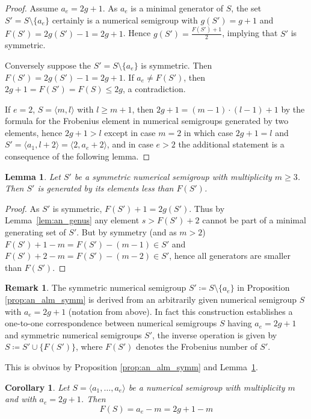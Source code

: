 \documentclass[a4paper,12pt,scrbook]{amsart}
\theoremstyle{plain}%
\newtheorem{lemma}[satz]{Lemma}
\newtheorem{corollary}[satz]{Corollary}
\theoremstyle{definition}
\newtheorem{rem}[satz]{Remark}
\begin{document}
\begin{proof}
Assume $a_e = 2g+1$. 
As $a_e$ is a minimal generator of $S$, the set $S' = S \setminus \{ a_e\}$ certainly 
is a numerical semigroup with $g(S') = g+1$ and $F(S') = 2 g(S')-1 = 2g+1$. Hence 
$g(S') = \frac {F(S')+1}{2}$, implying that $S'$ is symmetric. 

Conversely suppose the $S' =S \setminus\{a_e\}$ is symmetric. Then 
$F(S') = 2g(S')-1 = 2g+1$.
If $a_e \neq F(S')$, then $2g+1 = F(S') = F(S) \leq 2g$, a contradiction.

If $e = 2$, $S = \langle m, l \rangle$ with $l \geq m+1 $, then $2 g+1 = 
(m-1) \cdot (l-1) + 1$ by the formula for the Frobenius element in 
numerical semigroups generated by two elements, hence $2g+1>l$ 
except in case $m = 2$ in which case $2g+1 = l$ 
and $S' = \langle a_1, l+2\rangle = \langle 2, a_e+2 \rangle$, 
and in case $e >2$ the additional statement is a 
consequence of the following lemma.  
\end{proof}

\begin{lemma}\label{lem:sym_max_gen}
Let $S'$ be a symmetric numerical semigroup with multiplicity $m \geq 3$. Then 
$S'$ is generated by its elements less than $F(S')$. 
\end{lemma}

\begin{proof}
As $S'$ is symmetric, $F(S') + 1 = 2g(S')$. Thus by Lemma~\ref{lem:an_genus} 
any element $s>F(S')+2$ cannot be part of a minimal generating set of $S'$. But by 
symmetry  (and as $m > 2$) $F(S')+1-m = F(S')-(m-1) \in S'$ and $F(S')+2-m 
= F(S')-(m-2) \in S'$, hence all generators are smaller than $F(S')$.
\end{proof}

\begin{rem}
The symmetric numerical semigroup 
$S'\coloneqq S\setminus\{a_e\}$ in Proposition \ref{prop:an_alm_symm}
is derived from an arbitrarily given numerical 
semigroup $S$ with $a_e=2g+1$ (notation from above). In fact this 
construction establishes a one-to-one correspondence between numerical 
semigroups $S$ having $a_e=2g+1$ and symmetric numerical semigroups $S'$, 
the inverse operation is given by $S\coloneqq S'\cup\{F(S')\}$, where $F(S')$ 
denotes the Frobenius number of $S'$.

This is obviuos by Proposition \ref{prop:an_alm_symm} and 
Lemma~\ref{lem:sym_max_gen}.
\end{rem}

\begin{corollary}\label{cor:an_frob}
Let $S = \langle a_1, \ldots, a_e\rangle$ be a numerical semigroup with multiplicity $m$ 
and with $a_e = 2g+1$. Then 
	$$ F(S) = a_e - m = 2g+1 - m $$
\end{corollary}
\end{document}
